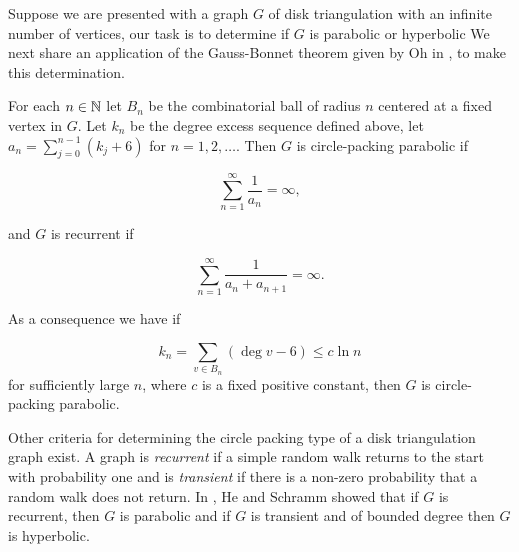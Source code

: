 Suppose we are presented with a graph $G$ of disk triangulation with an infinite 
number of vertices, our task is to determine if $G$ is parabolic or hyperbolic
We next share an application of the Gauss-Bonnet theorem given by Oh in \cite{oh_criteria_2022},
to make this determination.


\begin{theorem}\label{thm:Oh-packing}
For each $n\in\mathbb{N}$ let $B_n$ be the combinatorial ball of radius $n$
centered at a fixed vertex in $G.$ Let $k_n$ be the degree excess sequence
defined above, let $a_n=\sum_{j=0}^{n-1}(k_j+6)$ for $n=1,2,\ldots$.
Then $G$ is circle-packing parabolic if 

\begin{equation}\label{eqn:cp-parabolic}
\sum_{n=1}^{\infty}\frac{1}{a_n}=\infty,
\end{equation}

and $G$ is recurrent if

\begin{equation}\label{eqn:recurrent}
\sum_{n=1}^{\infty}\frac{1}{a_n+a_{n+1}}=\infty.
\end{equation}

\end{theorem}

As a consequence we have if

$$k_n=\sum_{v\in B_n}(\deg v -6)\leq c\ln n$$
for sufficiently large $n$, where $c$ is a fixed positive constant,
then $G$ is circle-packing parabolic.


Other criteria for determining the circle packing type of a disk triangulation graph exist.
A graph is \emph{recurrent} if a simple random walk returns to the start with probability one
and is \emph{transient} if there is a non-zero probability that a random walk does not return.
In \cite{he_hyperbolic_1995}, He and Schramm showed that if $G$ is recurrent, then $G$
is parabolic and if $G$ is transient and of bounded degree then $G$ is hyperbolic.

